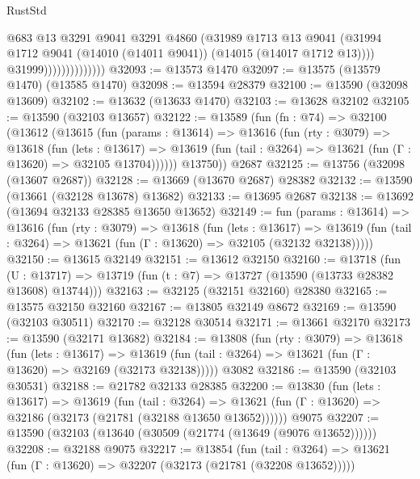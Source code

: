 \begin{lexlean}{RustStd}
\begin{coremodule}
                                @683
                                @13
                                @3291
                                @9041
                                @3291
                                @4860
                                (@31989
                                  @1713
                                  @13
                                  @9041
                                  (@31994
                                    @1712
                                    @9041
                                    (@14010 (@14011 @9041))
                                    (@14015 (@14017 @1712 @13))))
                                @31999))))))))))))))
@32093 := @13573 @1470
@32097 := @13575 (@13579 @1470) (@13585 @1470)
@32098 := @13594 @28379
@32100 := @13590 (@32098 @13609)
@32102 := @13632 (@13633 @1470)
@32103 := @13628 @32102
@32105 := @13590 (@32103 @13657)
@32122 := @13589
    (fun (fn : @74) =>
    @32100
      (@13612
        (@13615
          (fun (params : @13614) =>
          @13616
            (fun (rty : @3079) =>
            @13618
              (fun (lets : @13617) =>
              @13619 (fun (tail : @3264) => @13621 (fun (Γ : @13620) => @32105 @13704))))))
        @13750))
    @2687
@32125 := @13756 (@32098 (@13607 @2687))
@32128 := @13669 (@13670 @2687) @28382
@32132 := @13590 (@13661 (@32128 @13678) @13682)
@32133 := @13695 @2687
@32138 := @13692 (@13694 @32133 @28385 @13650 @13652)
@32149 := fun (params : @13614) =>
  @13616
    (fun (rty : @3079) =>
    @13618
      (fun (lets : @13617) =>
      @13619 (fun (tail : @3264) => @13621 (fun (Γ : @13620) => @32105 (@32132 @32138)))))
@32150 := @13615 @32149
@32151 := @13612 @32150
@32160 := @13718
    (fun (U : @13717) => @13719 (fun (t : @7) => @13727 (@13590 (@13733 @28382 @13608) @13744)))
@32163 := @32125 (@32151 @32160) @28380
@32165 := @13575 @32150 @32160
@32167 := @13805 @32149 @8672
@32169 := @13590 (@32103 @30511)
@32170 := @32128 @30514
@32171 := @13661 @32170
@32173 := @13590 (@32171 @13682)
@32184 := @13808
    (fun (rty : @3079) =>
    @13618
      (fun (lets : @13617) =>
      @13619 (fun (tail : @3264) => @13621 (fun (Γ : @13620) => @32169 (@32173 @32138)))))
    @3082
@32186 := @13590 (@32103 @30531)
@32188 := @21782 @32133 @28385
@32200 := @13830
    (fun (lets : @13617) =>
    @13619
      (fun (tail : @3264) =>
      @13621 (fun (Γ : @13620) => @32186 (@32173 (@21781 (@32188 @13650 @13652))))))
    @9075
@32207 := @13590 (@32103 (@13640 (@30509 (@21774 (@13649 (@9076 @13652))))))
@32208 := @32188 @9075
@32217 := @13854
    (fun (tail : @3264) => @13621 (fun (Γ : @13620) => @32207 (@32173 (@21781 (@32208 @13652)))))

\end{coremodule}
\end{lexlean}
